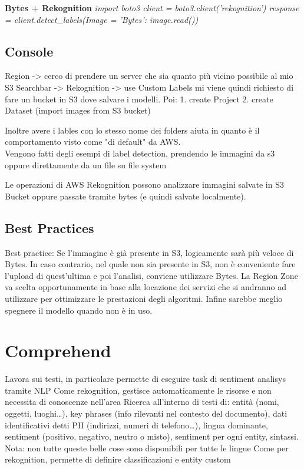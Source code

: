 \documentclass{classes/base}
\begin{document}
    \textbf{Bytes + Rekognition}
    \textit{import boto3
    client = boto3.client('rekognition') 
    response = client.detect_labels(Image = {'Bytes': image.read()})}

    \subsection*{Console}
    Region -> cerco di prendere un server che sia quanto più vicino possibile al mio S3
    Searchbar -> Rekognition -> use Custom Labels
    mi viene quindi richiesto di fare un bucket in S3 dove salvare i modelli.
    Poi: 1. create Project
        2. create Dataset (import images from S3 bucket)

    Inoltre avere i lables con lo stesso nome dei folders aiuta in quanto è il comportamento visto come "di default" da AWS.\\

    Vengono fatti degli esempi di label detection, prendendo le immagini da s3 oppure direttamente da un file su file system

    Le operazioni di AWS Rekognition possono analizzare immagini salvate in S3 Bucket oppure passate tramite bytes (e quindi salvate localmente).

    \subsection*{Best Practices}
    Best practice: Se l’immagine è già presente in S3, logicamente sarà più veloce di Bytes.
    In caso contrario, nel quale non sia presente in S3, non è conveniente fare l’upload di quest’ultima e poi l’analisi, conviene utilizzare Bytes.
    La Region Zone va scelta opportunamente in base alla locazione dei servizi che si andranno ad utilizzare per ottimizzare le prestazioni degli algoritmi.
    Infine sarebbe meglio spegnere il modello quando non è in uso.

    \section*{Comprehend}
    Lavora sui testi, in particolare permette di eseguire task di sentiment analisys tramite NLP
    Come rekognition, gestisce automaticamente le risorse e non necessita di conoscenze nell’area
    Ricerca all’interno di testi di: entità (nomi, oggetti, luoghi…), key phrases (info rilevanti nel contesto del documento), dati identificativi detti PII (indirizzi, numeri di telefono…), lingua dominante, sentiment (positivo, negativo, neutro o misto), sentiment per ogni entity, sintassi. Nota: non tutte queste belle cose sono disponibili per tutte le lingue
    Come per rekognition, permette di definire classificazioni e entity custom
\end{document}
